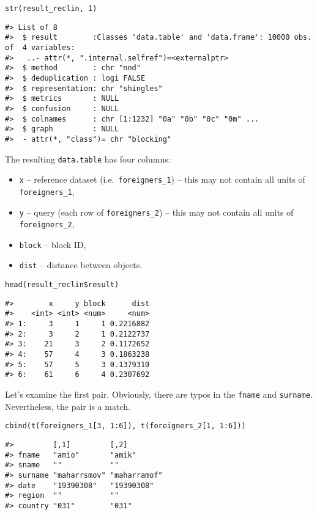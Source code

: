 \begin{verbatim}
str(result_reclin, 1)
\end{verbatim}

\begin{verbatim}
#> List of 8
#>  $ result        :Classes 'data.table' and 'data.frame': 10000 obs. of  4 variables:
#>   ..- attr(*, ".internal.selfref")=<externalptr> 
#>  $ method        : chr "nnd"
#>  $ deduplication : logi FALSE
#>  $ representation: chr "shingles"
#>  $ metrics       : NULL
#>  $ confusion     : NULL
#>  $ colnames      : chr [1:1232] "0a" "0b" "0c" "0m" ...
#>  $ graph         : NULL
#>  - attr(*, "class")= chr "blocking"
\end{verbatim}

The resulting \texttt{data.table} has four columns:

\begin{itemize}
\tightlist
\item
  \texttt{x} -- reference dataset (i.e.~\texttt{foreigners\_1}) -- this may not
  contain all units of \texttt{foreigners\_1},
\item
  \texttt{y} -- query (each row of \texttt{foreigners\_2}) -- this may not contain
  all units of \texttt{foreigners\_2},
\item
  \texttt{block} -- block ID,
\item
  \texttt{dist} -- distance between objects.
\end{itemize}

\begin{verbatim}
head(result_reclin$result)
\end{verbatim}

\begin{verbatim}
#>        x     y block      dist
#>    <int> <int> <num>     <num>
#> 1:     3     1     1 0.2216882
#> 2:     3     2     1 0.2122737
#> 3:    21     3     2 0.1172652
#> 4:    57     4     3 0.1863238
#> 5:    57     5     3 0.1379310
#> 6:    61     6     4 0.2307692
\end{verbatim}

Let's examine the first pair. Obviously, there are typos in the \texttt{fname}
and \texttt{surname}. Nevertheless, the pair is a match.

\begin{verbatim}
cbind(t(foreigners_1[3, 1:6]), t(foreigners_2[1, 1:6]))
\end{verbatim}

\begin{verbatim}
#>         [,1]         [,2]        
#> fname   "amio"       "amik"      
#> sname   ""           ""          
#> surname "maharrsmov" "maharramof"
#> date    "19390308"   "19390308"  
#> region  ""           ""          
#> country "031"        "031"
\end{verbatim}

